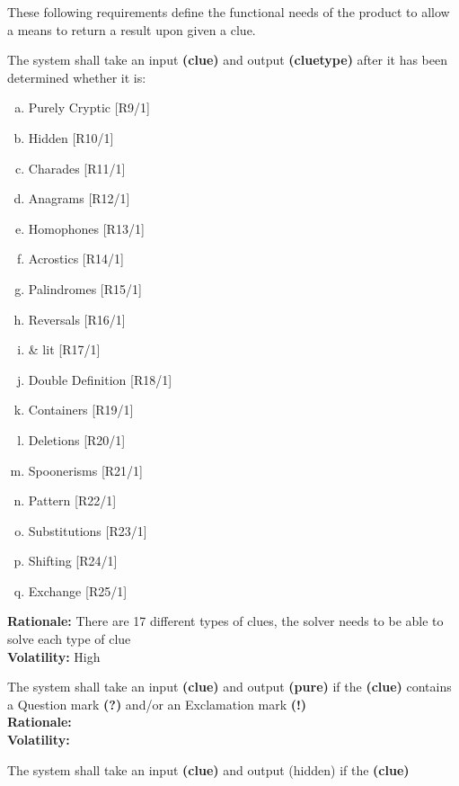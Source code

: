 These following requirements define the functional needs of the product to allow a means to return a result upon given a clue.

\noindent\llap{\textbf{[R8/1]}}The system shall take an input \textbf{\textbf{(clue)}} and output \textbf{(cluetype)} after it has been determined whether it is:

\begin{enumerate} [(a)] %
\item Purely Cryptic 				\hfill{[R9/1]}
\item Hidden 						\hfill{[R10/1]}
\item Charades 						\hfill{[R11/1]}
\item Anagrams 						\hfill{[R12/1]}
\item Homophones 					\hfill{[R13/1]}
\item Acrostics 					\hfill{[R14/1]}
\item Palindromes 					\hfill{[R15/1]}
\item Reversals 					\hfill{[R16/1]}
\item \& lit 						\hfill{[R17/1]}
\item Double Definition 			\hfill{[R18/1]}
\item Containers 					\hfill{[R19/1]}
\item Deletions 					\hfill{[R20/1]}
\item Spoonerisms 					\hfill{[R21/1]}
\item Pattern 						\hfill{[R22/1]}
\item Substitutions 				\hfill{[R23/1]}
\item Shifting 						\hfill{[R24/1]}
\item Exchange 						\hfill{[R25/1]}
\end{enumerate}

\textbf{Rationale:}  There are 17 different types of clues, the solver needs to be able to solve each type of clue\\
\textbf{Volatility:} High

\noindent\llap{\textbf{[R9/1]}}The system shall take an input \textbf{(clue)} and output \textbf{(pure)} if the \textbf{(clue)} contains a Question mark \textbf{(?)} and/or an Exclamation mark \textbf{(!)}\\

\textbf{Rationale:}  \\
\textbf{Volatility:} 

\noindent\llap{\textbf{[R10/1]}}The system shall take an input \textbf{(clue)} and output (hidden) if the \textbf{(clue)}

